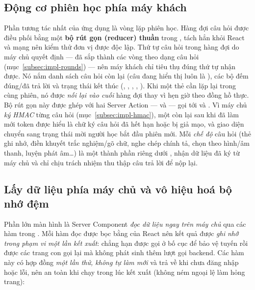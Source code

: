 \subsection{Động cơ phiên học phía máy khách}
\label{subsec:fe-learn}

Phần tương tác nhất của ứng dụng là vòng lặp phiên học. Hàng đợi câu hỏi được
điều phối bằng một \textbf{bộ rút gọn (reducer) thuần} trong
, tách hẳn khỏi React và mạng nên kiểm thử đơn vị được
độc lập. Thứ tự câu hỏi trong hàng đợi do máy chủ quyết định --- đã sắp thành
các vòng theo dạng câu hỏi (mục~\ref{subsec:impl-rounds}) --- nên máy khách
chỉ tiêu thụ đúng thứ tự nhận được. Nó nắm danh sách câu hỏi còn lại (câu đang
hiển thị luôn là
), các bộ đếm đúng/đã trả lời và trạng thái kết thúc
(, , , , ). Khi
một thẻ cần lặp lại trong cùng phiên, nó được \textit{nối lại vào cuối} hàng
đợi thay vì hẹn giờ theo đồng hồ thực. Bộ rút gọn này được ghép với hai Server
Action ---  và  --- gọi tới
 và . Vì máy chủ \textit{ký
HMAC} từng câu hỏi (mục~\ref{subsec:impl-hmac}), một  còn lại sau khi
đã làm mới token được hiểu là chữ ký câu hỏi đã hết hạn hoặc bị giả mạo, và giao
diện chuyển sang trạng thái  mời người học bắt đầu phiên mới. Mỗi
\textit{chế độ} câu hỏi (thẻ ghi nhớ, điền khuyết trắc nghiệm/gõ chữ, nghe chép
chính tả, chọn theo hình/âm thanh, luyện phát âm\ldots) là một thành phần riêng
dưới , nhận dữ liệu đã ký từ máy chủ và chỉ chịu trách
nhiệm thu thập câu trả lời để nộp lại.

\subsection{Lấy dữ liệu phía máy chủ và vô hiệu hoá bộ nhớ đệm}
\label{subsec:fe-data}

Phần lớn màn hình là Server Component \textit{đọc dữ liệu ngay trên máy chủ}
qua các hàm trong . Mỗi hàm đọc được bọc bằng 
của React nên kết quả được \textit{ghi nhớ trong phạm vi một lần kết xuất}:
chẳng hạn  được gọi ở bố cục để bảo vệ tuyến rồi được các trang con
gọi lại mà không phát sinh thêm lượt gọi backend. Các hàm này có hợp đồng
\textit{một lần thử, không tự làm mới} và trả về  khi chưa đăng nhập
hoặc lỗi, nên an toàn khi chạy trong lúc kết xuất (không ném ngoại lệ làm hỏng
trang):

